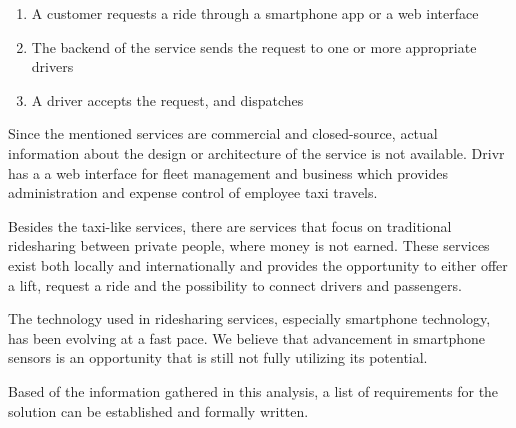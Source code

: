 \begin{enumerate}
	\item A customer requests a ride through a smartphone app or a web interface
	\item The backend of the service sends the request to one or more appropriate drivers
	\item A driver accepts the request, and dispatches
\end{enumerate}

Since the mentioned services are commercial and closed-source, actual information about the  design or architecture of the service is not available.
Drivr has a a web interface for fleet management and business which provides administration and expense control of employee taxi travels.

Besides the taxi-like services, there are services that focus on traditional ridesharing between private people, where money is not earned.
These services exist both locally and internationally and provides the opportunity to either offer a lift, request a ride and the possibility to connect drivers and passengers.



The technology used in ridesharing services, especially smartphone technology, has been evolving at a fast pace.\cite{fastCOMPUTERPHONES}
We believe that advancement in smartphone sensors is an opportunity that is still not fully utilizing its potential.

Based of the information gathered in this analysis, a list of requirements for the solution can be established and formally written.